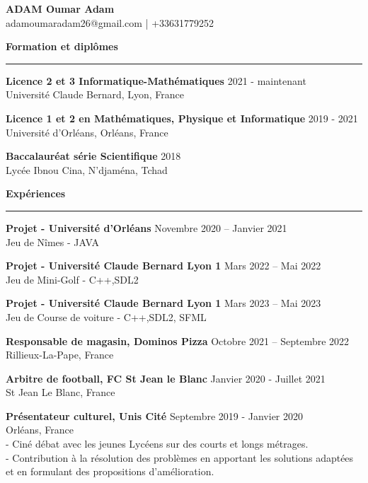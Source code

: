 \documentclass[10pt,a4paper]{article}
\renewcommand{\section}[1]{
    \vspace{5pt}
    \textcolor{heading}{\large\textbf{#1}}
    \par\noindent\rule{\textwidth}{0.4pt}
}
\begin{document}
\begin{center}
    \textcolor{emphasis}{\LARGE\textbf{ADAM Oumar Adam}} \\
    \vspace{5pt}
    \textcolor{accent}{adamoumaradam26@gmail.com} \hspace{5pt} | \hspace{5pt} \textcolor{accent}{+33631779252}
\end{center}

\section{Formation et diplômes}
\textbf{Licence 2 et 3 Informatique-Mathématiques} \hfill 2021 - maintenant \\
Université Claude Bernard, Lyon, France

\textbf{Licence 1 et 2 en Mathématiques, Physique et Informatique} \hfill 2019 - 2021 \\
Université d'Orléans, Orléans, France

\textbf{Baccalauréat série Scientifique} \hfill 2018 \\
Lycée Ibnou Cina, N'djaména, Tchad

\section{Expériences}
\textbf{Projet - Université d'Orléans} \hfill Novembre 2020 -- Janvier 2021 \\
Jeu de Nîmes - JAVA

\textbf{Projet - Université Claude Bernard Lyon 1} \hfill Mars 2022 -- Mai 2022 \\
Jeu de Mini-Golf - C++,SDL2

\textbf{Projet - Université Claude Bernard Lyon 1} \hfill Mars 2023 -- Mai 2023 \\
Jeu de Course de voiture - C++,SDL2, SFML

\textbf{Responsable de magasin, Dominos Pizza} \hfill Octobre 2021 -- Septembre 2022 \\
Rillieux-La-Pape, France

\textbf{Arbitre de football, FC St Jean le Blanc} \hfill Janvier 2020 - Juillet 2021 \\
St Jean Le Blanc, France

\textbf{Présentateur culturel, Unis Cité} \hfill Septembre 2019 - Janvier 2020 \\
Orléans, France \\
- Ciné débat avec les jeunes Lycéens sur des courts et longs métrages. \\
- Contribution à la résolution des problèmes en apportant les solutions adaptées et en formulant des propositions d'amélioration.
\end{document}
